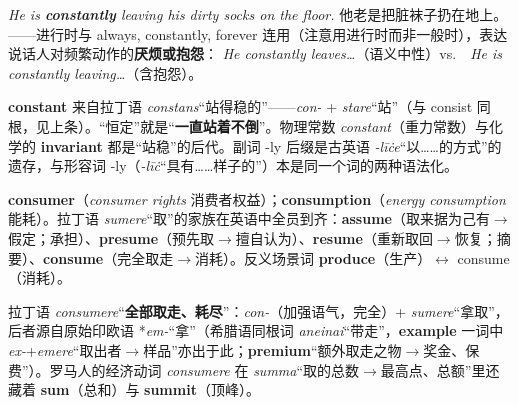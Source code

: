 \documentclass[../main.tex]{subfiles}
\begin{document}


\begin{gram}
\textit{He is \textbf{constantly} leaving his dirty socks on the floor.} 他老是把脏袜子扔在地上。——进行时与 always, constantly, forever 连用（注意用进行时而非一般时），表达说话人对频繁动作的\textbf{厌烦或抱怨}： \textit{He constantly leaves\dots}（语义中性）vs.\ \checkmark\ \textit{He is constantly leaving\dots}（含抱怨）。
\end{gram}

\begin{origin}
\textbf{constant} 来自拉丁语 \textit{constans}“站得稳的”——\textit{con-} + \textit{stare}“站”（与 consist 同根，见上条）。“恒定”就是“\textbf{一直站着不倒}”。物理常数 \textit{constant}（重力常数）与化学的 \textbf{invariant} 都是“站稳”的后代。副词 -ly 后缀是古英语 \textit{-līċe}“以……的方式”的遗存，与形容词 -ly（\textit{-līċ}“具有……样子的”）本是同一个词的两种语法化。
\end{origin}




\begin{gram}[sume 词族]
\textbf{consumer}（\textit{consumer rights} 消费者权益）；\textbf{consumption}（\textit{energy consumption} 能耗）。拉丁语 \textit{sumere}“取”的家族在英语中全员到齐：\textbf{assume}（取来据为己有$\to$假定；承担）、\textbf{presume}（预先取$\to$擅自认为）、\textbf{resume}（重新取回$\to$恢复；摘要）、\textbf{consume}（完全取走$\to$消耗）。反义场景词 \textbf{produce}（生产）$\leftrightarrow$ consume（消耗）。
\end{gram}

\begin{origin}
拉丁语 \textit{consumere}“\textbf{全部取走、耗尽}”：\textit{con-}（加强语气，完全）+ \textit{sumere}“拿取”，后者源自原始印欧语 *\textit{em-}“拿”（希腊语同根词 \textit{aneinai}“带走”，\textbf{example} 一词中 \textit{ex-}+\textit{emere}“取出者$\to$样品”亦出于此；\textbf{premium}“额外取走之物$\to$奖金、保费”）。罗马人的经济动词 \textit{consumere} 在 \textit{summa}“取的总数$\to$最高点、总额”里还藏着 \textbf{sum}（总和）与 \textbf{summit}（顶峰）。
\end{origin}
\end{document}
